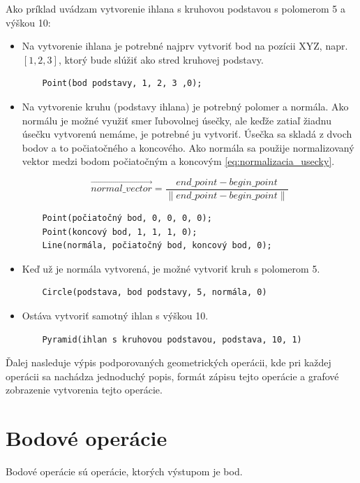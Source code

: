 Ako príklad uvádzam vytvorenie ihlana s kruhovou podstavou s polomerom 5 a výškou 10:
\begin{itemize}
    \item Na vytvorenie ihlana je potrebné najprv vytvoriť bod na pozícii XYZ, napr. $\left [ 1, 2, 3 \right ]$, ktorý bude slúžiť ako stred kruhovej podstavy.
	\begin{lstlisting}
	Point(bod podstavy, 1, 2, 3 ,0);
	\end{lstlisting}
	\item Na vytvorenie kruhu (podstavy ihlana) je potrebný polomer a normála. Ako normálu je možné využiť smer ľubovolnej úsečky, ale keďže zatiaľ žiadnu úsečku vytvorenú nemáme, je potrebné ju vytvoriť. Úsečka sa skladá z dvoch bodov a to počiatočného a koncového. Ako normála sa použije normalizovaný vektor medzi bodom počiatočným a koncovým \ref{eq:normalizacia_usecky}.

	\begin{equation}
		\overrightarrow{normal\_vector}=
		\frac{end\_point - begin\_point}{
		\left \|  end\_point - begin\_point \right \|}
	\label{eq:normalizacia_usecky}
	\end{equation}

	\begin{lstlisting}
	Point(počiatočný bod, 0, 0, 0, 0);
	Point(koncový bod, 1, 1, 1, 0);
	Line(normála, počiatočný bod, koncový bod, 0);
	\end{lstlisting}
	\item Keď už je normála vytvorená, je možné vytvoriť kruh s polomerom 5.
	\begin{lstlisting}
	Circle(podstava, bod podstavy, 5, normála, 0) 
	\end{lstlisting}
	\item Ostáva vytvoriť samotný ihlan s výškou 10.
	\begin{lstlisting}
	Pyramid(ihlan s kruhovou podstavou, podstava, 10, 1)
	\end{lstlisting}
\end{itemize}


Ďalej nasleduje výpis podporovaných geometrických operácii, kde pri každej operácii sa nachádza jednoduchý popis, formát zápisu tejto operácie a grafové zobrazenie vytvorenia tejto operácie.


\section{Bodové operácie}
Bodové operácie sú operácie, ktorých výstupom je bod.
